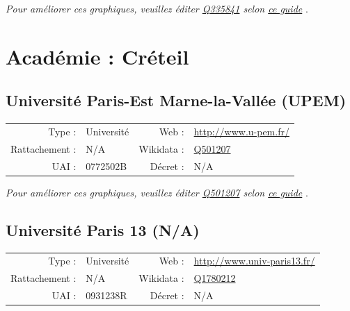 \documentclass[12pt,french,landscape]{article}
\begin{document}
\textit{\scriptsize Pour améliorer ces graphiques, veuillez éditer \href{https://www.wikidata.org/entity/Q335841}{Q335841}  selon \href{https://github.com/cpesr/wikidataESR/blob/master/Rmd/wikidataESR.md}{ce guide}}
.


\newpage

\hypertarget{acaduxe9mie-cruxe9teil}{%
\section{Académie : Créteil}\label{acaduxe9mie-cruxe9teil}}

\hypertarget{universituxe9-paris-est-marne-la-valluxe9e-upem}{%
\subsection{Université Paris-Est Marne-la-Vallée
(UPEM)}\label{universituxe9-paris-est-marne-la-valluxe9e-upem}}

\begin{tabular*}{0.45\textwidth}{rp{2cm}rl}  
\hline  
Type : & Université & Web : &\href{http://www.u-pem.fr/}{http://www.u-pem.fr/} \\  
Rattachement : & N/A & Wikidata : & \href{https://www.wikidata.org/entity/Q501207}{Q501207} \\  
UAI : & 0772502B & Décret : & N/A \\  
\hline  
\end{tabular*}

\textit{\scriptsize Pour améliorer ces graphiques, veuillez éditer \href{https://www.wikidata.org/entity/Q501207}{Q501207}  selon \href{https://github.com/cpesr/wikidataESR/blob/master/Rmd/wikidataESR.md}{ce guide}}
.


\newpage

\hypertarget{universituxe9-paris-13-na}{%
\subsection{Université Paris 13 (N/A)}\label{universituxe9-paris-13-na}}

\begin{tabular*}{0.45\textwidth}{rp{2cm}rl}  
\hline  
Type : & Université & Web : &\href{http://www.univ-paris13.fr/}{http://www.univ-paris13.fr/} \\  
Rattachement : & N/A & Wikidata : & \href{https://www.wikidata.org/entity/Q1780212}{Q1780212} \\  
UAI : & 0931238R & Décret : & N/A \\  
\hline  
\end{tabular*}
\end{document}
